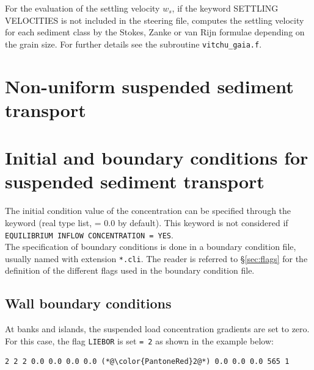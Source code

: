 For the evaluation of the settling velocity $w_s $, if the keyword {\ttfamily SETTLING VELOCITIES} is not included in the steering file, \gaia{} computes the settling velocity for each sediment class by the Stokes, Zanke or van Rijn formulae depending on the grain size. For further details see the subroutine \texttt{vitchu\_gaia.f}.


\section{Non-uniform suspended sediment transport}

\section{Initial and boundary conditions for suspended sediment transport}
The initial condition value of the concentration can be specified through the keyword  (real type list, {\ttfamily = 0.0} by default). This keyword is not considered if \texttt{EQUILIBRIUM INFLOW CONCENTRATION = YES}.\\

The specification of boundary conditions is done in a boundary condition file, usually named with extension \texttt{*.cli}. The reader is referred to \S\ref{sec:flags} for the definition of the different flags used in the boundary condition file.

\subsection{Wall boundary conditions}
At banks and islands, the suspended load concentration gradients are set to zero. For this case, the flag \texttt{LIEBOR} is set \texttt{= 2} as shown in the example below:

\begin{lstlisting}[frame=trBL]
2 2 2 0.0 0.0 0.0 0.0 (*@\color{PantoneRed}2@*) 0.0 0.0 0.0 565 1
\end{lstlisting}

